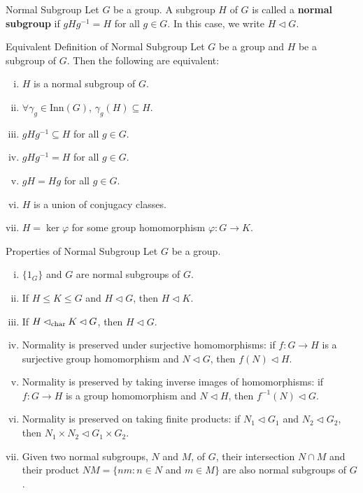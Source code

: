 \begin{definition}{Normal Subgroup}{}
    Let $G$ be a group. A subgroup $H$ of $G$ is called a \textbf{normal subgroup} if $gHg^{-1}=H$ for all $g\in G$. In this case, we write $H\lhd G$.
\end{definition}

\begin{proposition}{Equivalent Definition of Normal Subgroup}{}
    Let $G$ be a group and $H$ be a subgroup of $G$. Then the following are equivalent:
    \begin{enumerate}[(i)]
        \item $H$ is a normal subgroup of $G$.
        \item $\forall \gamma_g \in\mathrm{Inn}(G)$, $\gamma_g(H)\subseteq H$.
        \item $gHg^{-1}\subseteq H$ for all $g\in G$.
        \item $gHg^{-1}=H$ for all $g\in G$.
        \item $gH=Hg$ for all $g\in G$.
        \item $H$ is a union of conjugacy classes.
        \item $H=\ker\varphi$ for some group homomorphism $\varphi:G\to K$.
    \end{enumerate}
\end{proposition}

\begin{proposition}{Properties of Normal Subgroup}{}
    Let $G$ be a group.
    \begin{enumerate}[(i)]
        \item $\{1_G\}$ and $G$ are normal subgroups of $G$.
        \item If $H\le K\le G$ and $H\lhd G$, then $H\lhd K$.
        \item If $H\lhd_{\rm char} K\lhd G$, then $H\lhd G$.
        \item Normality is preserved under surjective homomorphisms: if $f:G \rightarrow H$ is a surjective group homomorphism and $N\lhd G$, then $f(N)\lhd H$.
        \item Normality is preserved by taking inverse images of homomorphisms: if $f:G \rightarrow H$ is a group homomorphism and $N\lhd H$, then $f^{-1}(N)\lhd G$.
        \item Normality is preserved on taking finite products: if $N_1 \lhd G_1$ and $N_2 \lhd G_2$, then $N_1 \times N_2 \lhd G_1 \times G_2$.
        \item Given two normal subgroups, $N$ and $M$, of $G$, their intersection $N \cap M$ and their product $N M=\{n m: n \in N$ and $m \in M\}$ are also normal subgroups of $G$.
    \end{enumerate}
\end{proposition}

